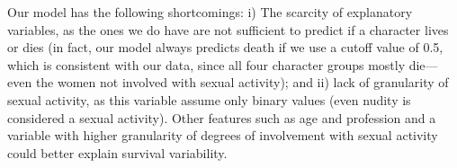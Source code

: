 \documentclass[10pt]{article}
\begin{document}
Our model has the following shortcomings: i) The scarcity of explanatory variables, as the ones we do have are not sufficient to predict if a character lives or dies (in fact, our model always predicts death if we use a cutoff value of 0.5, which is consistent with our data, since all four character groups mostly die---even the women not involved with sexual activity); and ii) lack of granularity of sexual activity, as this variable assume only binary values (even nudity is considered a sexual activity). Other features such as age and profession and a variable with higher granularity of degrees of involvement with sexual activity could better explain survival variability.
\end{document}
